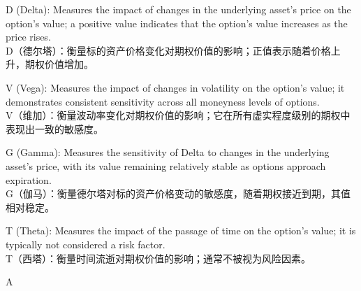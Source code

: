 \documentclass{article}
\begin{document}
\begin{choices}
    \item D (Delta): Measures the impact of changes in the underlying asset's price on the option's value; a positive value indicates that the option's value increases as the price rises.\\
    D（德尔塔）：衡量标的资产价格变化对期权价值的影响；正值表示随着价格上升，期权价值增加。
    \item V (Vega): Measures the impact of changes in volatility on the option's value; it demonstrates consistent sensitivity across all moneyness levels of options.\\
    V（维加）：衡量波动率变化对期权价值的影响；它在所有虚实程度级别的期权中表现出一致的敏感度。
    \item G (Gamma): Measures the sensitivity of Delta to changes in the underlying asset's price, with its value remaining relatively stable as options approach expiration.\\
    G（伽马）：衡量德尔塔对标的资产价格变动的敏感度，随着期权接近到期，其值相对稳定。
    \item T (Theta): Measures the impact of the passage of time on the option's value; it is typically not considered a risk factor.\\
    T（西塔）：衡量时间流逝对期权价值的影响；通常不被视为风险因素。
\end{choices}

\begin{correctanswer}
    A
\end{correctanswer}
\end{document}
